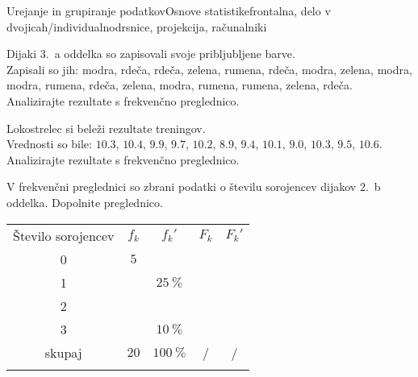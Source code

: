 \begin{priprava}{2}{}{Urejanje in grupiranje podatkov}{Osnove statistike}{frontalna, delo v dvojicah/individualno}{drsnice, projekcija, računalniki}
                
                
                    \begin{naloga}
                        Dijaki 3.~a oddelka so zapisovali svoje pribljubljene barve. \\
                        Zapisali so jih: modra, rdeča, rdeča, zelena, rumena, rdeča, modra, zelena, modra, modra, rumena, rdeča, zelena, modra, rumena, rumena, zelena, rdeča. \\
                        Analizirajte rezultate s frekvenčno preglednico. 
                    \end{naloga}

                    \begin{naloga}
                        Lokostrelec si beleži rezultate treningov. \\
                        Vrednosti so bile: $10.3$, $10.4$, $9.9$, $9.7$, $10.2$, $8.9$, $9.4$, $10.1$, $9.0$, $10.3$, $9.5$, $10.6$. \\
                        Analizirajte rezultate s frekvenčno preglednico. 
                    \end{naloga}
                

                
        
                   \begin{naloga}
                    
                    V frekvenčni preglednici so zbrani podatki o številu sorojencev dijakov 2.~b oddelka.
                    Dopolnite preglednico.
    
                        \begin{table}[H]
                            \centering
                            \begin{tabular}{||c|c|c|c|c||} 
                            \hhline{|t:=====:t|}
                            \rowcolor[rgb]{0.843,0.718,0.718} 
                            Število sorojencev  & $f_k$ & $f_k'$ & $F_k$ & $F_k'$   \\ 
                            \hhline{|:=====:|}
                            0 & $5$  & & &  \\ 
                            \hline
                            1 & & $25~\%$ & &    \\ 
                            \hline
                            2 & & & &    \\ 
                            \hline
                            3 & & $10~\%$ & &   \\
                            \hline
                            skupaj & $20$ & $100~\%$ & / & /    \\
                            \hhline{|b:=====:b|}
                            \end{tabular}
                        \end{table}
                    \end{naloga}
    
            



\end{priprava}